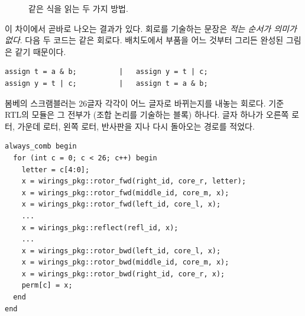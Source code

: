 \begin{figure}[ht]
\centering
{}
\caption{같은 식을 읽는 두 가지 방법.}
\label{fig:g-assign}
\end{figure}

이 차이에서 곧바로 나오는 결과가 있다. 회로를 기술하는 문장은 \emph{적는 순서가 의미가 없다}.
다음 두 코드는 같은 회로다. 배치도에서 부품을 어느 것부터 그리든 완성된 그림은 같기 때문이다.

\begin{lstlisting}[language=SV,numbers=none]
assign t = a & b;          |   assign y = t | c;
assign y = t | c;          |   assign t = a & b;
\end{lstlisting}

\Ours 봄베의 스크램블러는 26글자 각각이 어느 글자로 바뀌는지를 내놓는 회로다. 기준 RTL의
 모듈은 그 전부가 (조합 논리를 기술하는 블록) 하나다. 글자 하나가
오른쪽 로터, 가운데 로터, 왼쪽 로터, 반사판을 지나 다시 돌아오는 경로를 적었다.

\begin{lstlisting}[language=SV,caption={\code{rtl/src/scrambler.sv}의 본체(그리스 로터 부분 생략).},label={lst:g-scr}]
always_comb begin
  for (int c = 0; c < 26; c++) begin
    letter = c[4:0];
    x = wirings_pkg::rotor_fwd(right_id, core_r, letter);
    x = wirings_pkg::rotor_fwd(middle_id, core_m, x);
    x = wirings_pkg::rotor_fwd(left_id, core_l, x);
    ...
    x = wirings_pkg::reflect(refl_id, x);
    ...
    x = wirings_pkg::rotor_bwd(left_id, core_l, x);
    x = wirings_pkg::rotor_bwd(middle_id, core_m, x);
    x = wirings_pkg::rotor_bwd(right_id, core_r, x);
    perm[c] = x;
  end
end
\end{lstlisting}

